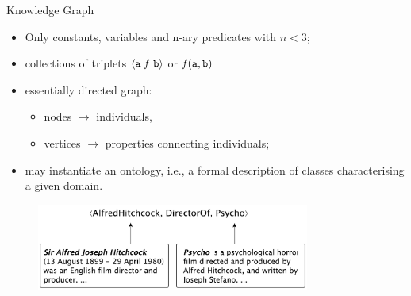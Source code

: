 \documentclass[presentation]{beamer}\mode<presentation>{\usetheme{AMSBolognaFC}}
\begin{document}
\begin{frame}[allowframebreaks]{Knowledge Graph}
    
    \begin{itemize}
        \item Only constants, variables and n-ary predicates with $n < 3$;
        \item collections of triplets $\langle \mathtt{a}\ \mathit{f}\ \mathtt{b} \rangle$ or $\mathit{f}(\mathtt{a}, \mathtt{b})$
        \item essentially directed graph:
        \begin{itemize}
            \item nodes $\rightarrow$ individuals,
            \item vertices $\rightarrow$ properties connecting individuals;
        \end{itemize}
        \item may instantiate an ontology, i.e., a formal description of classes characterising a given domain.
    \end{itemize}
    
    \framebreak
    
    \begin{figure}
        \centering
        \includegraphics[width=0.8\textwidth]{figures/kg-example}
    \end{figure}    
\end{frame}    
    
\end{document}
